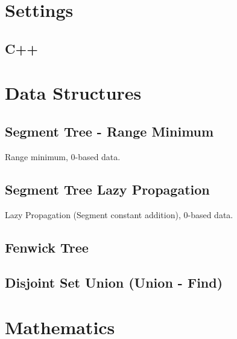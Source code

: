 \documentclass[landscape,8pt]{article}
\begin{document}
\newpage
\maketitle
\begin{multicols}{3}\raggedcolumns
\tableofcontents
\end{multicols}
\pagebreak
\begin{multicols}{2}\raggedcolumns


\section{Settings}
  \subsection{C++}
    

\section{Data Structures}
  \subsection{Segment Tree - Range Minimum}
     Range minimum, 0-based data.
     

  \subsection{Segment Tree Lazy Propagation}
     Lazy Propagation (Segment constant addition), 0-based data.
     

  \subsection{Fenwick Tree}
    

  \subsection{Disjoint Set Union (Union - Find)}
    

\section{Mathematics}

\end{multicols}
\end{document}
